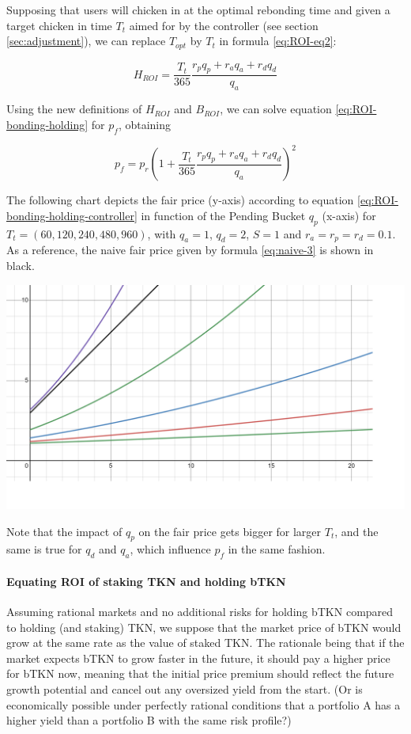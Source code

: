 \documentclass{article}
\begin{document}
Supposing that users will chicken in at the optimal rebonding time and given a target chicken in time $T_t$ aimed for by the controller (see section \ref{sec:adjustment}), we can replace $T_{opt}$ by $T_t$ in formula \ref{eq:ROI-eq2}:

\begin{equation}
  \label{eq:HROI-controller}
    H_{ROI} = \frac{T_t}{365} \frac{r_p q_p + r_a q_a + r_d q_d}{q_a}
\end{equation} 

Using the new definitions of $H_{ROI}$ and $B_{ROI}$, we can solve equation \ref{eq:ROI-bonding-holding} for $p_f$, obtaining

\begin{equation}
  \label{eq:ROI-bonding-holding-controller}
  p_f = p_r\left(1 + \frac{T_t}{365} \frac{r_p q_p + r_a q_a + r_d q_d}{q_a}\right)^2 
\end{equation}

The following chart depicts the fair price (y-axis) according to equation \ref{eq:ROI-bonding-holding-controller} in function of the Pending Bucket $q_p$ (x-axis) for $T_t=(60, 120, 240, 480, 960)$, with $q_a=1$, $q_d=2$, $S=1$ and $r_a=r_p=r_d=0.1$.
As a reference, the naive fair price given by formula \ref{eq:naive-3} is shown in black.

\includegraphics[width=\linewidth]{./ChickenBonds_Whitepaper_controller_price.png}

Note that the impact of $q_p$ on the fair price gets bigger for larger $T_t$, and the same is true for $q_d$ and $q_a$, which influence $p_f$ in the same fashion.

\paragraph{Equating ROI of staking TKN and holding bTKN}
Assuming rational markets and no additional risks for holding bTKN compared to holding (and staking) TKN, we suppose that the market price of bTKN would grow at the same rate as the value of staked TKN. The rationale being that if the market expects bTKN to grow faster in the future, it should pay a higher price for bTKN now, meaning that the initial price premium should reflect the future growth potential and cancel out any oversized yield from the start. (Or is economically possible under perfectly rational conditions that a portfolio A has a higher yield than a portfolio B with the same risk profile?)
\end{document}
